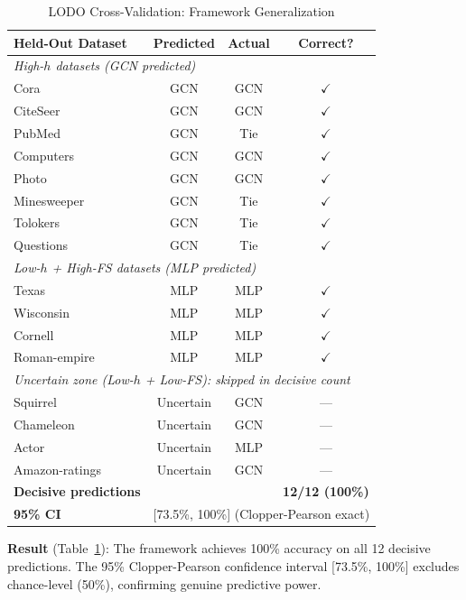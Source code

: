 \begin{table}[t]
\centering
\caption{LODO Cross-Validation: Framework Generalization}
\label{tab:lodo_validation}
\small
\begin{tabular}{@{}lccc@{}}
\toprule
\textbf{Held-Out Dataset} & \textbf{Predicted} & \textbf{Actual} & \textbf{Correct?} \\
\midrule
\multicolumn{4}{l}{\textit{High-$h$ datasets (GCN predicted)}} \\
Cora & GCN & GCN & $\checkmark$ \\
CiteSeer & GCN & GCN & $\checkmark$ \\
PubMed & GCN & Tie & $\checkmark$ \\
Computers & GCN & GCN & $\checkmark$ \\
Photo & GCN & GCN & $\checkmark$ \\
Minesweeper & GCN & Tie & $\checkmark$ \\
Tolokers & GCN & Tie & $\checkmark$ \\
Questions & GCN & Tie & $\checkmark$ \\
\midrule
\multicolumn{4}{l}{\textit{Low-$h$ + High-FS datasets (MLP predicted)}} \\
Texas & MLP & MLP & $\checkmark$ \\
Wisconsin & MLP & MLP & $\checkmark$ \\
Cornell & MLP & MLP & $\checkmark$ \\
Roman-empire & MLP & MLP & $\checkmark$ \\
\midrule
\multicolumn{4}{l}{\textit{Uncertain zone (Low-$h$ + Low-FS): skipped in decisive count}} \\
Squirrel & Uncertain & GCN & --- \\
Chameleon & Uncertain & GCN & --- \\
Actor & Uncertain & MLP & --- \\
Amazon-ratings & Uncertain & GCN & --- \\
\midrule
\textbf{Decisive predictions} & \multicolumn{2}{c}{} & \textbf{12/12 (100\%)} \\
\textbf{95\% CI} & \multicolumn{3}{c}{[73.5\%, 100\%] (Clopper-Pearson exact)} \\
\bottomrule
\end{tabular}
\end{table}

\textbf{Result} (Table~\ref{tab:lodo_validation}): The framework achieves 100\% accuracy on all 12 decisive predictions. The 95\% Clopper-Pearson confidence interval [73.5\%, 100\%] excludes chance-level (50\%), confirming genuine predictive power.

